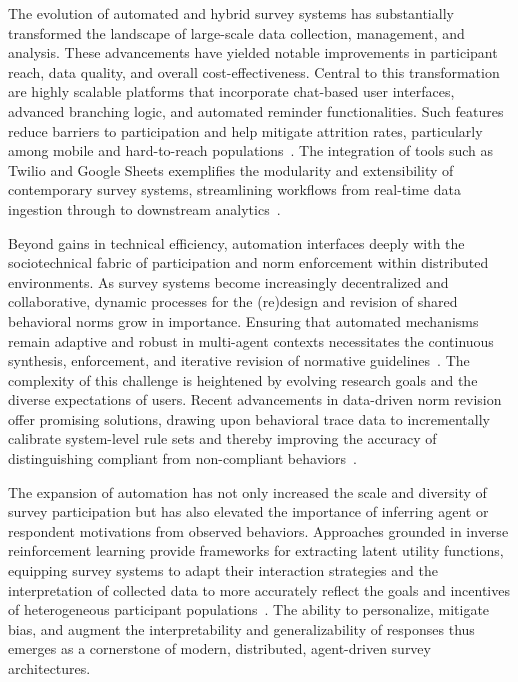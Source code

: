 \documentclass[sigconf]{acmart}
\begin{document}
The evolution of automated and hybrid survey systems has substantially transformed the landscape of large-scale data collection, management, and analysis. These advancements have yielded notable improvements in participant reach, data quality, and overall cost-effectiveness. Central to this transformation are highly scalable platforms that incorporate chat-based user interfaces, advanced branching logic, and automated reminder functionalities. Such features reduce barriers to participation and help mitigate attrition rates, particularly among mobile and hard-to-reach populations~\cite{ref117}. The integration of tools such as Twilio and Google Sheets exemplifies the modularity and extensibility of contemporary survey systems, streamlining workflows from real-time data ingestion through to downstream analytics~\cite{ref117}.

Beyond gains in technical efficiency, automation interfaces deeply with the sociotechnical fabric of participation and norm enforcement within distributed environments. As survey systems become increasingly decentralized and collaborative, dynamic processes for the (re)design and revision of shared behavioral norms grow in importance. Ensuring that automated mechanisms remain adaptive and robust in multi-agent contexts necessitates the continuous synthesis, enforcement, and iterative revision of normative guidelines~\cite{ref17}. The complexity of this challenge is heightened by evolving research goals and the diverse expectations of users. Recent advancements in data-driven norm revision offer promising solutions, drawing upon behavioral trace data to incrementally calibrate system-level rule sets and thereby improving the accuracy of distinguishing compliant from non-compliant behaviors~\cite{ref17}.

The expansion of automation has not only increased the scale and diversity of survey participation but has also elevated the importance of inferring agent or respondent motivations from observed behaviors. Approaches grounded in inverse reinforcement learning provide frameworks for extracting latent utility functions, equipping survey systems to adapt their interaction strategies and the interpretation of collected data to more accurately reflect the goals and incentives of heterogeneous participant populations~\cite{ref18}. The ability to personalize, mitigate bias, and augment the interpretability and generalizability of responses thus emerges as a cornerstone of modern, distributed, agent-driven survey architectures.
\end{document}
